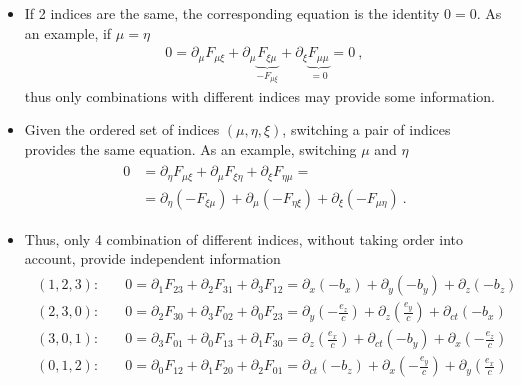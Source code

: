 \documentclass[letterpaper,10pt,english]{jupyterBook}
\begin{document}
\begin{itemize}
\item {} 
\sphinxAtStartPar
If 2 indices are the same, the corresponding equation is the identity \(0 = 0\). As an example, if \(\mu = \eta\)
\begin{equation*}
\begin{split}0 =  \partial_{\mu} F_{\mu \xi} + \partial_{\mu} \underbrace{F_{\xi \mu}}_{-F_{\mu \xi}} + \partial_{\xi} \underbrace{F_{\mu \mu}}_{=0} = 0 \ , \end{split}
\end{equation*}
\sphinxAtStartPar
thus only combinations with different indices may provide some information.

\item {} 
\sphinxAtStartPar
Given the ordered set of indices \((\mu, \eta, \xi)\), switching a pair of indices provides the same equation. As an example, switching \(\mu\) and \(\eta\)
\begin{equation*}
\begin{split}\begin{aligned}
    0 & = \partial_{\eta} F_{\mu  \xi} + \partial_{\mu} F_{\xi \eta} + \partial_{\xi} F_{\eta \mu} = \\
      & = \partial_{\eta} ( - F_{\xi \mu} ) + \partial_{\mu} ( - F_{\eta \xi} ) + \partial_{\xi} ( -F_{\mu \eta} ) \ .
  \end{aligned}\end{split}
\end{equation*}
\item {} 
\sphinxAtStartPar
Thus, only 4 combination of different indices, without taking order into account, provide independent information
\begin{equation*}
\begin{split}\begin{aligned}
    (1,2,3): & \quad 0 = \partial_{1} F_{23} + \partial_{2} F_{31} + \partial_{3} F_{12} = \partial_x (-b_x) + \partial_y (-b_y) + \partial_z (-b_z)  \\
    (2,3,0): & \quad 0 = \partial_{2} F_{30} + \partial_{3} F_{02} + \partial_{0} F_{23} = \partial_y \left(-\frac{e_z}{c} \right) + \partial_z \left( \frac{e_y}{c} \right) + \partial_{ct} (-b_x) \\
    (3,0,1): & \quad 0 = \partial_{3} F_{01} + \partial_{0} F_{13} + \partial_{1} F_{30} = \partial_z \left(\frac{e_x}{c}\right) + \partial_{ct} (-b_y) + \partial_x  \left(-\frac{e_z}{c}\right) \\
    (0,1,2): & \quad 0 = \partial_{0} F_{12} + \partial_{1} F_{20} + \partial_{2} F_{01} = \partial_{ct} (-b_z) + \partial_x \left(-\frac{e_y}{c}\right) + \partial_y  \left(\frac{e_x}{c}\right)     \\

\end{aligned}
\end{split}
\end{equation*}
\end{itemize}
\end{document}
